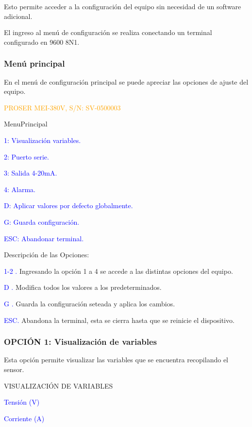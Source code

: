 Esto permite acceder a la configuración del equipo sin necesidad de un software adicional.

El ingreso al menú de configuración se realiza conectando un terminal configurado en 9600 8N1.


\subsubsection{Menú principal}
En el menú de configuración principal se puede apreciar las opciones de ajuste del equipo.

\textcolor{orange}{
PROSER MEI-380V, S/N: SV-0500003}


\textcolor{mygreen}{MenuPrincipal}

\textcolor{blue}{1: Visualización variables.}

\textcolor{blue}{2: Puerto serie.}

\textcolor{blue}{3: Salida 4-20mA.}

\textcolor{blue}{4: Alarma.}

\textcolor{blue}{D: Aplicar valores por defecto globalmente.}

\textcolor{blue}{G: Guarda configuración.}

\textcolor{blue}{ESC: Abandonar terminal.}



Descripción de las Opciones:


\textcolor{blue}{1-2 .}
Ingresando la opción 1 a 4 se accede a las distintas opciones del equipo.

\textcolor{blue}{D .}
Modifica todos los valores a los predeterminados.

\textcolor{blue}{G .}
Guarda la configuración seteada y aplica los cambios.

\textcolor{blue}{ESC.}
Abandona la terminal, esta se cierra hasta que se reinicie el dispositivo.

\subsubsection{OPCIÓN 1: Visualización de variables}
Esta opción permite visualizar las variables que se encuentra recopilando el sensor.

\textcolor{mygreen}{VISUALIZACIÓN DE VARIABLES }

\textcolor{blue}{Tensión (V)}

\textcolor{blue}{Corriente (A)}

